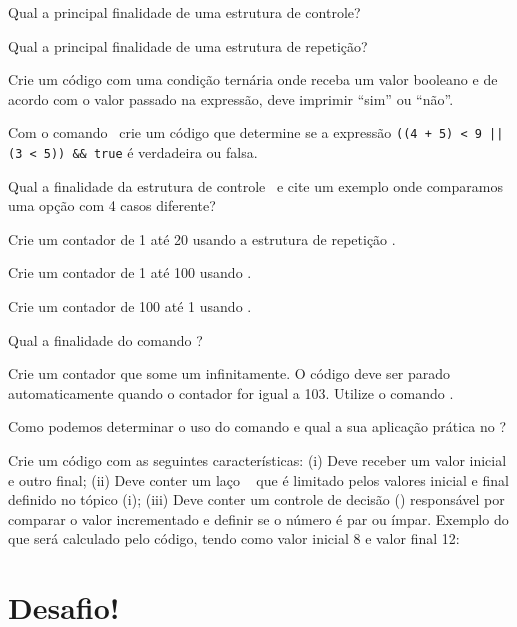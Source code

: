 \begin{description}[labelindent=30pt]
  \item [Q. 01] Qual a principal finalidade de uma estrutura de controle?
  \item [Q. 02] Qual a principal finalidade de uma estrutura de repetição?
  \item [Q. 03] Crie um código com uma condição ternária onde receba um valor booleano e 
  de acordo com o valor passado na expressão, deve imprimir ``sim'' ou ``não''.
  \item [Q. 04] Com o comando \comandoifelse~crie um código que determine se a expressão 
  \texttt{((4 + 5) < 9 || (3 < 5)) \&\& true} é verdadeira ou falsa.
  \item [Q. 05] Qual a finalidade da estrutura de controle \comandoswitch~e cite um exemplo onde comparamos 
  uma opção com 4 casos diferente?
  \item [Q. 06] Crie um contador de 1 até 20 usando a estrutura de repetição \comandowhile.
  \item [Q. 07] Crie um contador de 1 até 100 usando \comandodowhile.
  \item [Q. 08] Crie um contador de 100 até 1 usando \comandofor.
  \item [Q. 09] Qual a finalidade do comando \comandoforeach?
  \item [Q. 10] Crie um contador que some um infinitamente. O código deve ser parado automaticamente
  quando o contador for igual a 103. Utilize o comando \comandobreak. 
  \item [Q. 11] Como podemos determinar o uso do comando \comandocontinue e qual a sua aplicação prática
  no \php? 
  \item [Q. 12] Crie um código com as seguintes características: (i) Deve receber um valor inicial e outro
  final; (ii) Deve conter um laço \comandofor~ que é limitado pelos valores inicial e final definido no tópico
  (i); (iii) Deve conter um controle de decisão (\comandoifelse) responsável por comparar o valor incrementado
  e definir se o número é par ou ímpar. Exemplo do que será calculado pelo código, tendo como valor inicial
  8 e valor final 12:
  

\end{description}



\section{Desafio!}
\label{cap5-desafio}
